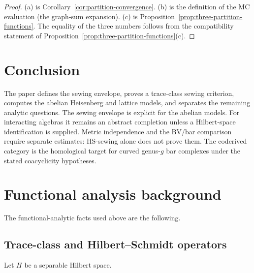 \documentclass[11pt,reqno]{amsart}
\theoremstyle{definition}
\theoremstyle{remark}
\numberwithin{equation}{section}
\begin{document}
\begin{proof}
(a) is Corollary~\ref{cor:partition-convergence}.
(b) is the definition of the MC evaluation (the graph-sum
expansion).  (c) is
Proposition~\ref{prop:three-partition-functions}.  The
equality of the three numbers follows from the compatibility
statement of
Proposition~\ref{prop:three-partition-functions}(c).
\end{proof}



\section*{Conclusion}

The paper defines the sewing envelope, proves a trace-class sewing
criterion, computes the abelian Heisenberg and lattice models, and
separates the remaining analytic questions. The sewing envelope is
explicit for the abelian models. For interacting algebras it remains
an abstract completion unless a Hilbert-space identification is
supplied. Metric independence and the BV/bar comparison require
separate estimates: HS-sewing alone does not prove them. The
coderived category is the homological target for curved genus-$g$ bar
complexes under the stated coacyclicity hypotheses.



\appendix

\section{Functional analysis background}
\label{app:functional-analysis}

The functional-analytic facts used above are the following.

\subsection{Trace-class and Hilbert--Schmidt
 operators}\label{app:trace-hs}

Let $H$ be a separable Hilbert space.
\end{document}
